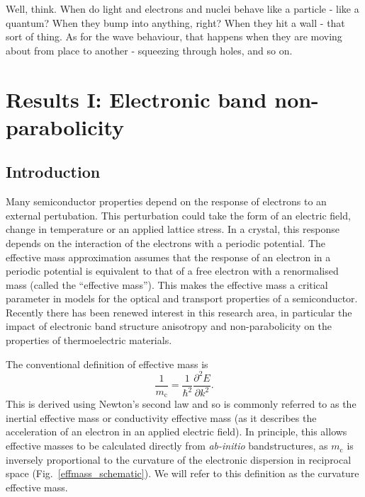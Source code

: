 \begin{savequote}[8cm]
Well, think. When do light and electrons and nuclei behave like a particle - like a quantum? When they bump into anything, right? When they hit a wall - that sort of thing. As for the wave behaviour, that happens when they are moving about from place to another - squeezing through holes, and so on.
\end{savequote}


\chapter{\label{ch:4-effmass}Results I: Electronic band non-parabolicity}

\section{Introduction}

Many semiconductor properties depend on the response of electrons to an external pertubation.
This perturbation could take the form of an electric field, change in temperature or an applied lattice stress.  %
In a crystal, this response depends on the interaction of the electrons with a periodic potential. 
The effective mass approximation assumes that the response of an electron in a periodic potential is equivalent to that of a free electron with a renormalised mass (called the ``effective mass'').
This makes the effective mass a critical parameter in models for the optical and transport properties of a semiconductor.
Recently there has been renewed interest in this research area, in particular the impact of electronic band structure anisotropy and non-parabolicity on the properties of thermoelectric materials.\autocite{Gibbs2017,Mecholsky2014}

The conventional definition of effective mass is
\begin{equation} \label{curvature}
\frac{1}{m_\text{c}}= \frac{1}{\hbar^2}\frac{\partial^2E}{\partial k^2}.
\end{equation}
This is derived using Newton's second law\autocite{Ashcroft1976,Ariel2012} and so is commonly referred to as the inertial effective mass or conductivity effective mass (as it describes the acceleration of an electron in an applied electric field).
In principle, this allows effective masses to be calculated directly from \textit{ab-initio} bandstructures,
as $m_\text{c}$ is inversely proportional to the curvature of the electronic dispersion in reciprocal space (Fig.\ \ref{effmass_schematic}). 
We will refer to this definition as the curvature effective mass.

